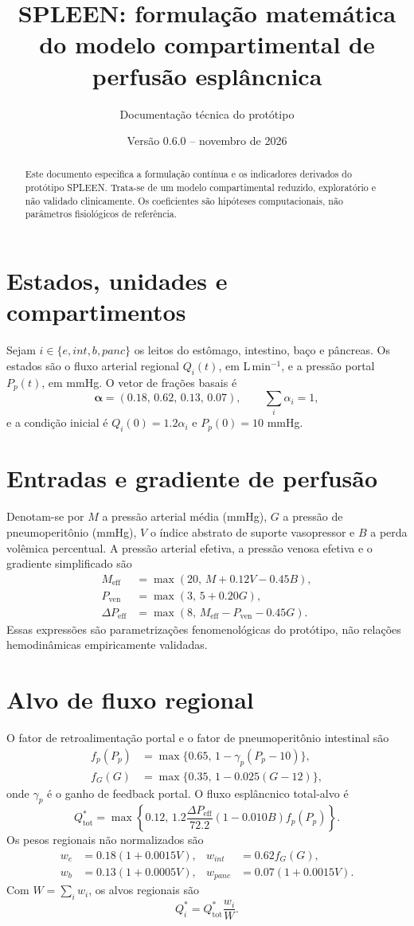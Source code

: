 \documentclass[11pt,a4paper]{article}
\title{SPLEEN: formulação matemática do modelo compartimental de perfusão esplâncnica}
\author{Documentação técnica do protótipo}
\date{Versão 0.6.0 -- novembro de 2026}
\begin{document}
\maketitle

\begin{abstract}
Este documento especifica a formulação contínua e os indicadores derivados do protótipo SPLEEN. Trata-se de um modelo compartimental reduzido, exploratório e não validado clinicamente. Os coeficientes são hipóteses computacionais, não parâmetros fisiológicos de referência.
\end{abstract}

\section{Estados, unidades e compartimentos}
Sejam $i\in\{e,int,b,panc\}$ os leitos do estômago, intestino, baço e pâncreas. Os estados são o fluxo arterial regional $Q_i(t)$, em L\,min$^{-1}$, e a pressão portal $P_p(t)$, em mmHg. O vetor de frações basais é
\[
\boldsymbol{\alpha}=(0.18,\,0.62,\,0.13,\,0.07),\qquad
\sum_i\alpha_i=1,
\]
e a condição inicial é $Q_i(0)=1.2\alpha_i$ e $P_p(0)=10$ mmHg.

\section{Entradas e gradiente de perfusão}
Denotam-se por $M$ a pressão arterial média (mmHg), $G$ a pressão de pneumoperitônio (mmHg), $V$ o índice abstrato de suporte vasopressor e $B$ a perda volêmica percentual. A pressão arterial efetiva, a pressão venosa efetiva e o gradiente simplificado são
\begin{align}
M_{\mathrm{eff}} &= \max(20,\,M+0.12V-0.45B),\\
P_{\mathrm{ven}} &= \max(3,\,5+0.20G),\\
\Delta P_{\mathrm{eff}} &= \max(8,\,M_{\mathrm{eff}}-P_{\mathrm{ven}}-0.45G).
\end{align}
Essas expressões são parametrizações fenomenológicas do protótipo, não relações hemodinâmicas empiricamente validadas.

\section{Alvo de fluxo regional}
O fator de retroalimentação portal e o fator de pneumoperitônio intestinal são
\begin{align}
f_p(P_p)&=\max\{0.65,\,1-\gamma_p(P_p-10)\},\\
f_G(G)&=\max\{0.35,\,1-0.025(G-12)\},
\end{align}
onde $\gamma_p$ é o ganho de feedback portal. O fluxo esplâncnico total-alvo é
\[
Q_{\mathrm{tot}}^*=\max\left\{0.12,\,
1.2\frac{\Delta P_{\mathrm{eff}}}{72.2}
(1-0.010B)f_p(P_p)\right\}.
\]
Os pesos regionais não normalizados são
\begin{align}
w_e&=0.18(1+0.0015V), & w_{int}&=0.62f_G(G),\\
w_b&=0.13(1+0.0005V), & w_{panc}&=0.07(1+0.0015V).
\end{align}
Com $W=\sum_iw_i$, os alvos regionais são
\[
Q_i^*=Q_{\mathrm{tot}}^*\frac{w_i}{W}.
\]
\end{document}
